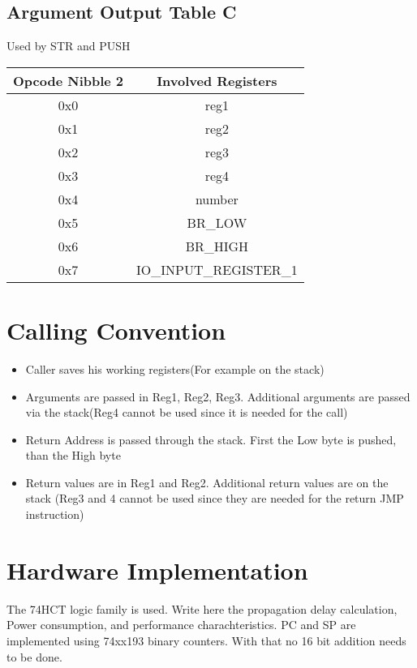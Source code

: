 \documentclass[a4paper, 12pt]{article}
\begin{document}
	\subsection{Argument Output Table C}
	Used by STR and PUSH
	\begin{center}
		\begin{tabular}{|c|c|}
			\hline
			Opcode Nibble 2 & Involved Registers \\ \hline
			0x0 & reg1 \\ \hline
			0x1 & reg2 \\ \hline
			0x2 & reg3 \\ \hline
			0x3 & reg4 \\ \hline
			0x4 & number \\ \hline
			0x5 & BR\_LOW \\ \hline
			0x6 & BR\_HIGH \\ \hline
			0x7 & IO\_INPUT\_REGISTER\_1 \\ \hline
		\end{tabular}
	\end{center}
	\section{Calling Convention}
		\begin{itemize}
			\item Caller saves his working registers(For example on the stack)
			\item Arguments are passed in Reg1, Reg2, Reg3. Additional arguments are passed via the stack(Reg4 cannot be used since it is needed for the call)
			\item Return Address is passed through the stack. First the Low byte is pushed, than the High byte
			\item Return values are in Reg1 and Reg2. Additional return values are on the stack (Reg3 and 4 cannot be used since they are needed for the return JMP instruction)
		\end{itemize}
	\section{Hardware Implementation}
	The 74HCT logic family is used.  Write here the propagation delay calculation, Power consumption, and performance charachteristics.
	PC and SP are implemented using 74xx193 binary counters. With that no 16 bit addition needs to be done.
\end{document}
